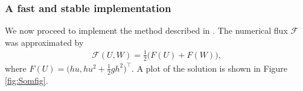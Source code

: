 \documentclass[12pt]{article}
\begin{document}
%
%
\subsubsection{A fast and stable implementation}
We now proceed to implement the method described in \cite{somRef2}. The numerical flux $\mathcal{F}$ was approximated by
\begin{align*}
    \mathcal{F}(U, W) = \frac{1}{2}\big(F(U) + F(W)\big),
\end{align*}
where $F(U) = \big(hu, hu^2 + \frac{1}{2}gh^2\big)^\top$.
A plot of the solution is shown in Figure \ref{fig:Somfig}.
%
%
\end{document}
